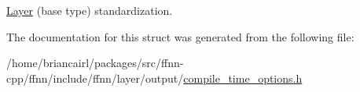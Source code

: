 \hyperlink{classffnn_1_1layer_1_1_layer}{Layer} (base type) standardization. 



The documentation for this struct was generated from the following file\-:\begin{DoxyCompactItemize}
\item 
/home/briancairl/packages/src/ffnn-\/cpp/ffnn/include/ffnn/layer/output/\hyperlink{output_2compile__time__options_8h}{compile\-\_\-time\-\_\-options.\-h}\end{DoxyCompactItemize}
